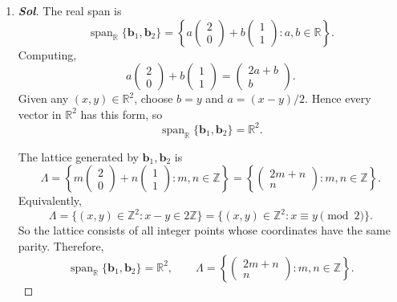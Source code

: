 \begin{enumerate}
\begin{proof}[\normalfont\color{magenta}\bfseries Sol]
		Therefore:
		\[
		\boxed{
			\mathbb{Z}^2,\ \{(a,\sqrt2 a):a\in\mathbb Z\},\ \{a(1,0)+b(1/2,1):a,b\in\mathbb Z\}
			\text{ are lattices, but }\mathbb Q^2\text{ is not.}
		}
		\]
	\end{proof}
	\newpage
	\item \begin{proof}[\normalfont\color{magenta}\bfseries Sol]
		The real span is
		\[
		\operatorname{span}_{\mathbb R}\{\mathbf{b}_1,\mathbf{b}_2\}
		=
		\left\{
		a\begin{pmatrix}2\\0\end{pmatrix}
		+
		b\begin{pmatrix}1\\1\end{pmatrix}
		:a,b\in\mathbb R
		\right\}.
		\]
		Computing,
		\[
		a\begin{pmatrix}2\\0\end{pmatrix}
		+
		b\begin{pmatrix}1\\1\end{pmatrix}
		=
		\begin{pmatrix}
			2a+b\\
			b
		\end{pmatrix}.
		\]
		Given any \((x,y)\in\mathbb R^2\), choose \(b=y\) and \(a=(x-y)/2\). Hence every vector in \(\mathbb R^2\) has this form, so
		\[
		\operatorname{span}_{\mathbb R}\{\mathbf{b}_1,\mathbf{b}_2\}=\mathbb R^2.
		\]
		
		The lattice generated by \(\mathbf{b}_1,\mathbf{b}_2\) is
		\[
		\Lambda
		=
		\left\{
		m\begin{pmatrix}2\\0\end{pmatrix}
		+
		n\begin{pmatrix}1\\1\end{pmatrix}
		:m,n\in\mathbb Z
		\right\}
		=
		\left\{
		\begin{pmatrix}
			2m+n\\
			n
		\end{pmatrix}
		:m,n\in\mathbb Z
		\right\}.
		\]
		Equivalently,
		\[
		\Lambda=\{(x,y)\in\mathbb Z^2:x-y\in 2\mathbb Z\}
		=\{(x,y)\in\mathbb Z^2:x\equiv y\pmod{2}\}.
		\]
		So the lattice consists of all integer points whose coordinates have the same parity.
		Therefore,
		\[
		\boxed{
			\operatorname{span}_{\mathbb R}\{\mathbf b_1,\mathbf b_2\}=\mathbb R^2,
			\qquad
			\Lambda=
			\left\{
			\begin{pmatrix}
				2m+n\\
				n
			\end{pmatrix}
			:m,n\in\mathbb Z
			\right\}.
		}
		\]
	\end{proof}
	

\end{enumerate}
